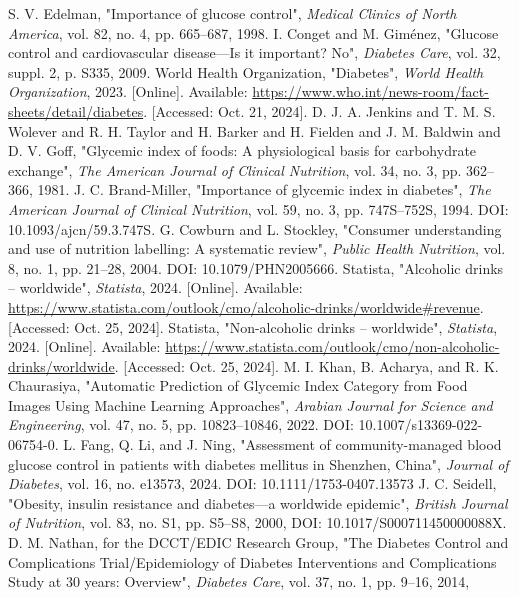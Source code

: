 \documentclass[conference]{IEEEtran}
\begin{document}
\begin{thebibliography}{00}
 S. V. Edelman, "Importance of glucose control", \textit{Medical Clinics of North America}, vol. 82, no. 4, pp. 665--687, 1998.
 I. Conget and M. Giménez, "Glucose control and cardiovascular disease—Is it important? No", \textit{Diabetes Care},
vol. 32, suppl. 2, p. S335, 2009.
 World Health Organization, "Diabetes", \textit{World Health Organization}, 2023. [Online]. Available: \url{https://www.who.int/news-room/fact-sheets/detail/diabetes}. [Accessed: Oct. 21, 2024].
 D. J. A. Jenkins and T. M. S. Wolever and R. H. Taylor and H. Barker and H. Fielden and J. M. Baldwin and D. V. Goff,
"Glycemic index of foods: A physiological basis for carbohydrate exchange", \textit{The American Journal of Clinical Nutrition},
vol. 34, no. 3, pp. 362–366, 1981.
 J. C. Brand-Miller, "Importance of glycemic index in diabetes", \textit{The American Journal of Clinical Nutrition},
vol. 59, no. 3, pp. 747S–752S, 1994. DOI: 10.1093/ajcn/59.3.747S.
 G. Cowburn and L. Stockley, "Consumer understanding and use of nutrition labelling: A systematic review",
\textit{Public Health Nutrition}, vol. 8, no. 1, pp. 21–28, 2004. DOI: 10.1079/PHN2005666.
 Statista, "Alcoholic drinks – worldwide", \textit{Statista}, 2024. [Online]. Available: \url{https://www.statista.com/outlook/cmo/alcoholic-drinks/worldwide#revenue}. [Accessed: Oct. 25, 2024].
 Statista, "Non-alcoholic drinks – worldwide", \textit{Statista}, 2024. [Online]. Available: \url{https://www.statista.com/outlook/cmo/non-alcoholic-drinks/worldwide}. [Accessed: Oct. 25, 2024].
 M. I. Khan, B. Acharya, and R. K. Chaurasiya, "Automatic Prediction of Glycemic Index Category from Food
Images Using Machine Learning Approaches", \textit{Arabian Journal for Science and Engineering}, vol. 47, no. 5, pp. 10823–10846,
2022. DOI: 10.1007/s13369-022-06754-0.
 L. Fang, Q. Li, and J. Ning, "Assessment of community-managed blood glucose control in patients with diabetes
mellitus in Shenzhen, China", \textit{Journal of Diabetes}, vol. 16, no. e13573, 2024. DOI: 10.1111/1753-0407.13573
 J. C. Seidell, "Obesity, insulin resistance and diabetes—a worldwide epidemic", \textit{British Journal of Nutrition},
vol. 83, no. S1, pp. S5–S8, 2000, DOI: 10.1017/S000711450000088X.
  D. M. Nathan, for the DCCT/EDIC Research Group, "The Diabetes Control and Complications Trial/Epidemiology
of Diabetes Interventions and Complications Study at 30 years: Overview", \textit{Diabetes Care}, vol. 37, no. 1, pp. 9–16, 2014,

\end{thebibliography}
\end{document}
